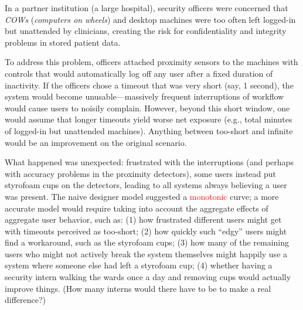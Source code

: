 \documentclass{acm_proc_article-sp}
\newcommand{\ignore}[1] {}
\begin{document}
In a partner institution (a large hospital), security officers were concerned
that {\em COWs} ({\em computers on wheels}) and desktop machines were 
too often left logged-in but unattended by clinicians, creating
the risk for confidentiality and integrity problems in stored patient data.

\ignore{In a partner institution (a large hospital),
clinicians used {\em COWs} ({\em computers on wheels}) and desktop machines.
The security officers were concerned
that these systems were too often left logged-in but unattended, creating
the risk for confidentiality and integrity problems in stored patient data.}

\ignore{To address this problem, the officers attached proximity sensors to the machines and added controls that,
when detecting that a computer had been left unattended but logged-in for a predetermined, fixed, period of time, the user would be automatically logged off.}
To address this problem, officers attached proximity sensors to the machines 
with controls that would automatically log off any user after a fixed 
duration of inactivity.
If the officers chose a timeout that was very short (say, 1 second),
the system would become unusable---massively frequent interruptions of workflow would cause users to noisily complain.  
However, beyond this short window, one would assume that longer timeouts
yield worse net exposure (e.g., total minutes of logged-in but unattended machines).   Anything between too-short and infinite would be an improvement 
on the original scenario.

What happened was unexpected:
frustrated with the interruptions (and perhaps with accuracy problems
in the proximity detectors), some users instead put styrofoam cups on the 
detectors, leading to all systems always believing a user was present.
The naive designer model suggested a \textcolor{red}{monotonic} \ignore{linear} curve; a more accurate model
would require taking into account the aggregate effects of aggregate user  behavior, such as: (1) how frustrated different users might get with timeouts perceived as too-short; (2) how quickly such ``edgy'' users might find a workaround, such as the styrofoam cups; (3) how many of the remaining users who might not actively break the system themselves might happily use a system where someone else had left a styrofoam cup; (4) whether having a security intern walking the wards once a day and removing cups would actually improve things.  (How many interns would there have to be to make a real difference?)
\end{document}
